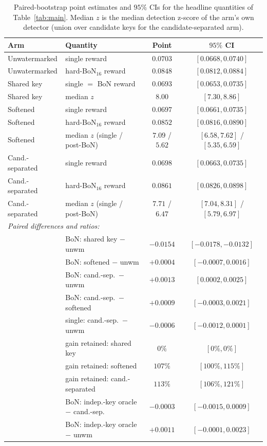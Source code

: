 \documentclass{article} %
\begin{document}
\begin{table}[h]
\centering
\small
\caption{Paired-bootstrap point estimates and $95\%$ CIs for the headline
quantities of Table~\ref{tab:main}. Median $z$ is the median detection
z-score of the arm's own detector (union over candidate keys for the
candidate-separated arm).}
\label{tab:ci}
\begin{tabular}{llcc}
\toprule
Arm & Quantity & Point & $95\%$ CI \\
\midrule
Unwatermarked & single reward & $0.0703$ & $[0.0668, 0.0740]$ \\
Unwatermarked & hard-BoN$_{16}$ reward & $0.0848$ & $[0.0812, 0.0884]$ \\
Shared key & single $=$ BoN reward & $0.0693$ & $[0.0653, 0.0735]$ \\
Shared key & median $z$ & $8.00$ & $[7.30, 8.86]$ \\
Softened & single reward & $0.0697$ & $[0.0661, 0.0735]$ \\
Softened & hard-BoN$_{16}$ reward & $0.0852$ & $[0.0816, 0.0890]$ \\
Softened & median $z$ (single / post-BoN) & $7.09$ / $5.62$ & $[6.58, 7.62]$ / $[5.35, 6.59]$ \\
Cand.-separated & single reward & $0.0698$ & $[0.0663, 0.0735]$ \\
Cand.-separated & hard-BoN$_{16}$ reward & $0.0861$ & $[0.0826, 0.0898]$ \\
Cand.-separated & median $z$ (single / post-BoN) & $7.71$ / $6.47$ & $[7.04, 8.31]$ / $[5.79, 6.97]$ \\
\midrule
\multicolumn{4}{l}{\emph{Paired differences and ratios:}} \\
& BoN: shared key $-$ unwm & $-0.0154$ & $[-0.0178, -0.0132]$ \\
& BoN: softened $-$ unwm & $+0.0004$ & $[-0.0007, 0.0016]$ \\
& BoN: cand.-sep.\ $-$ unwm & $+0.0013$ & $[0.0002, 0.0025]$ \\
& BoN: cand.-sep.\ $-$ softened & $+0.0009$ & $[-0.0003, 0.0021]$ \\
& single: cand.-sep.\ $-$ unwm & $-0.0006$ & $[-0.0012, 0.0001]$ \\
& gain retained: shared key & $0\%$ & $[0\%, 0\%]$ \\
& gain retained: softened & $107\%$ & $[100\%, 115\%]$ \\
& gain retained: cand.-separated & $113\%$ & $[106\%, 121\%]$ \\
& BoN: indep.-key oracle $-$ cand.-sep. & $-0.0003$ & $[-0.0015, 0.0009]$ \\
& BoN: indep.-key oracle $-$ unwm & $+0.0011$ & $[-0.0001, 0.0023]$ \\
\bottomrule
\end{tabular}
\end{table}
\end{document}
